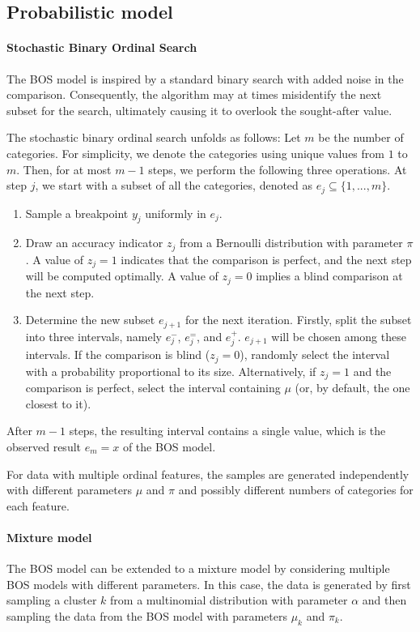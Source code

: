 \documentclass[a4paper,12pt]{article}
\begin{document}
\subsection{Probabilistic model}
\paragraph{Stochastic Binary Ordinal Search} The BOS model is inspired by a standard binary search with added noise in the comparison. Consequently, the algorithm may at times misidentify the next subset for the search, ultimately causing it to overlook the sought-after value.

The stochastic binary ordinal search unfolds as follows: Let $m$ be the number of categories. For simplicity, we denote the categories using unique values from $1$ to $m$. Then, for at most $m-1$ steps, we perform the following three operations. At step $j$, we start with a subset of all the categories, denoted as $e_j\subseteq \{1,...,m\}$.

\begin{enumerate}
    \item Sample a breakpoint $y_j$ uniformly in $e_j$.
    \item Draw an accuracy indicator $z_j$ from a Bernoulli distribution with parameter $\pi$. A value of $z_j=1$ indicates that the comparison is perfect, and the next step will be computed optimally. A value of $z_j=0$ implies a blind comparison at the next step.
    \item Determine the new subset $e_{j+1}$ for the next iteration. Firstly, split the subset into three intervals, namely $e_j^-$, $e_j^=$, and $e_j^+$. $e_{j+1}$ will be chosen among these intervals. If the comparison is blind ($z_j=0$), randomly select the interval with a probability proportional to its size. Alternatively, if $z_j=1$ and the comparison is perfect, select the interval containing $\mu$ (or, by default, the one closest to it).
\end{enumerate}
After $m-1$ steps, the resulting interval contains a single value, which is the observed result $e_m={x}$ of the BOS model.

For data with multiple ordinal features, the samples are generated independently with different parameters $\mu$ and $\pi$ and possibly different numbers of categories for each feature.

\paragraph{Mixture model} 
The BOS model can be extended to a mixture model by considering multiple BOS models with different parameters. In this case, the data is generated by first sampling a cluster $k$ from a multinomial distribution with parameter $\alpha$ and then sampling the data from the BOS model with parameters $\mu_k$ and $\pi_k$.
\end{document}
